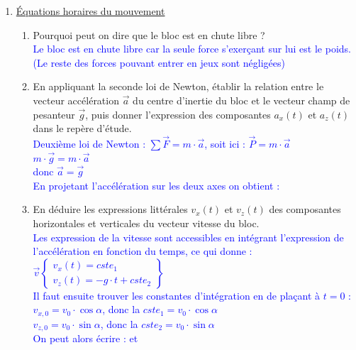 \documentclass[a4paper,12pt]{article}
\begin{document}
\begin{enumerate}
	\item \underline{Équations horaires du mouvement}
	\begin{enumerate}
		\item Pourquoi peut on dire que le bloc est en chute libre ?\\
		\textcolor{blue}{Le bloc est en chute libre car la seule force s'exerçant sur lui est le poids. (Le reste des forces pouvant entrer en jeux sont négligées)}
		\item En appliquant la seconde loi de Newton, établir la relation entre le vecteur accélération $\vec{a}$ du centre d’inertie du bloc et le vecteur champ de pesanteur $\vec{g}$, puis donner l’expression des composantes $a_x(t)$ et $a_z(t)$ dans le repère d’étude.\\
		\textcolor{blue}{Deuxième loi de Newton : $\sum \vec{F} = m \cdot \vec{a}$, soit ici : $\vec{P} = m \cdot \vec{a}$\\
		$m\cdot\vec{g}=m \cdot \vec{a}$\\
		donc $\vec{a}=\vec{g}$\\
		En projetant l'accélération sur les deux axes on obtient :
		\\
		}
		\item En déduire les expressions littérales $v_x(t)$ et $v_z(t)$ des composantes horizontales et verticales du vecteur vitesse du bloc.\\
		\textcolor{blue}{Les expression de la vitesse sont accessibles en intégrant l'expression de l'accélération en fonction du temps, ce qui donne :\\
		$\vec{v} \left\lbrace 
		\begin{array}{l}
		v_x(t) = cste_1\\
		v_z(t)=-g\cdot t + cste_2
		\end{array}
		\right\rbrace
		$\\
		Il faut ensuite trouver les constantes d'intégration en de plaçant à $t=0$ :\\
		$v_{x,0} = v_0\cdot \cos{\alpha}$, donc la $cste_1=v_0\cdot \cos{\alpha}$\\
		$v_{z,0} = v_0\cdot \sin{\alpha}$, donc la $cste_2 = v_0\cdot \sin{\alpha}$\\
		On peut alors écrire :  et 
}
\end{enumerate}
\end{enumerate}
\end{document}
